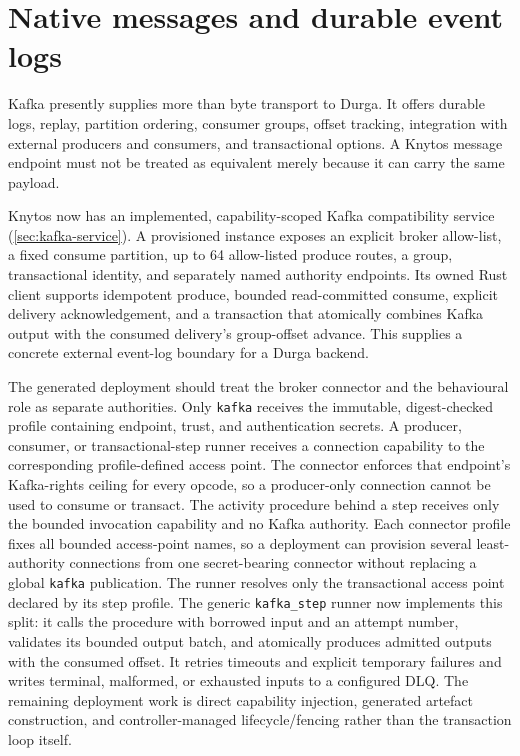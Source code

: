 \section{Native messages and durable event logs}

Kafka presently supplies more than byte transport to Durga. It offers durable
logs, replay, partition ordering, consumer groups, offset tracking, integration
with external producers and consumers, and transactional options. A Knytos
message endpoint must not be treated as equivalent merely because it can carry
the same payload.

Knytos now has an implemented, capability-scoped Kafka compatibility
service (\autoref{sec:kafka-service}). A provisioned instance exposes an
explicit broker allow-list, a fixed consume partition, up to 64 allow-listed produce routes, a
group, transactional identity, and separately named authority endpoints. Its
owned Rust client supports idempotent produce, bounded read-committed consume,
explicit delivery acknowledgement, and a transaction that atomically combines
Kafka output with the consumed delivery's group-offset advance. This supplies
a concrete external event-log boundary for a Durga backend.

The generated deployment should treat the broker connector and the behavioural
role as separate authorities. Only \texttt{kafka} receives the immutable,
digest-checked profile containing endpoint, trust, and authentication
secrets. A producer, consumer, or transactional-step runner receives a
connection capability to the corresponding profile-defined access point. The
connector enforces that endpoint's Kafka-rights ceiling for every opcode, so a
producer-only connection cannot be used to consume or transact. The activity procedure behind a step
receives only the bounded invocation capability and no Kafka authority.
Each connector profile fixes all bounded access-point names, so a deployment
can provision several least-authority connections from one secret-bearing
connector without replacing a global \texttt{kafka} publication. The runner
resolves only the transactional access point declared by its step profile.
The generic \texttt{kafka\_step} runner now implements this split: it calls the
procedure with borrowed input and an attempt number, validates its bounded
output batch, and atomically produces admitted outputs with the consumed
offset. It retries timeouts and explicit temporary failures and writes terminal,
malformed, or exhausted inputs to a configured DLQ. The remaining deployment
work is direct capability injection, generated artefact construction, and
controller-managed lifecycle/fencing rather than the transaction loop itself.


